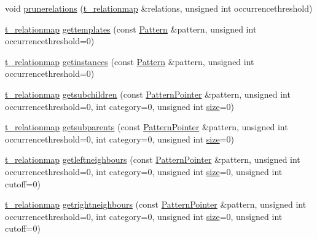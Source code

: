 \begin{DoxyCompactItemize}
\item 
void \hyperlink{classIndexedPatternModel_ad477f945c83813cc0c3766737be54214}{prunerelations} (\hyperlink{patternmodel_8h_a8695a2b10be5a74c827cd6c11bd46fb9}{t\+\_\+relationmap} \&relations, unsigned int occurrencethreshold)
\item 
\hyperlink{patternmodel_8h_a8695a2b10be5a74c827cd6c11bd46fb9}{t\+\_\+relationmap} \hyperlink{classIndexedPatternModel_acbf5086ccea0a356aff9817647192b33}{gettemplates} (const \hyperlink{classPattern}{Pattern} \&pattern, unsigned int occurrencethreshold=0)
\item 
\hyperlink{patternmodel_8h_a8695a2b10be5a74c827cd6c11bd46fb9}{t\+\_\+relationmap} \hyperlink{classIndexedPatternModel_a93a9511c2b8dabf2c977b7e1b63c3fc9}{getinstances} (const \hyperlink{classPattern}{Pattern} \&pattern, unsigned int occurrencethreshold=0)
\item 
\hyperlink{patternmodel_8h_a8695a2b10be5a74c827cd6c11bd46fb9}{t\+\_\+relationmap} \hyperlink{classIndexedPatternModel_adbc2f3af5e9fbdab9a754ed155bb54cb}{getsubchildren} (const \hyperlink{classPatternPointer}{Pattern\+Pointer} \&pattern, unsigned int occurrencethreshold=0, int category=0, unsigned int \hyperlink{classPatternModel_a2422cb944da209f399b3b10f3b1d2684}{size}=0)
\item 
\hyperlink{patternmodel_8h_a8695a2b10be5a74c827cd6c11bd46fb9}{t\+\_\+relationmap} \hyperlink{classIndexedPatternModel_ad85affa2176df3faf63b359e0c90e616}{getsubparents} (const \hyperlink{classPatternPointer}{Pattern\+Pointer} \&pattern, unsigned int occurrencethreshold=0, int category=0, unsigned int \hyperlink{classPatternModel_a2422cb944da209f399b3b10f3b1d2684}{size}=0)
\item 
\hyperlink{patternmodel_8h_a8695a2b10be5a74c827cd6c11bd46fb9}{t\+\_\+relationmap} \hyperlink{classIndexedPatternModel_a1d2e54a55dce955eadd2a09e93ce9b79}{getleftneighbours} (const \hyperlink{classPatternPointer}{Pattern\+Pointer} \&pattern, unsigned int occurrencethreshold=0, int category=0, unsigned int \hyperlink{classPatternModel_a2422cb944da209f399b3b10f3b1d2684}{size}=0, unsigned int cutoff=0)
\item 
\hyperlink{patternmodel_8h_a8695a2b10be5a74c827cd6c11bd46fb9}{t\+\_\+relationmap} \hyperlink{classIndexedPatternModel_a6b3626617a03ebeade50af34743d3541}{getrightneighbours} (const \hyperlink{classPatternPointer}{Pattern\+Pointer} \&pattern, unsigned int occurrencethreshold=0, int category=0, unsigned int \hyperlink{classPatternModel_a2422cb944da209f399b3b10f3b1d2684}{size}=0, unsigned int cutoff=0)

\end{DoxyCompactItemize}
